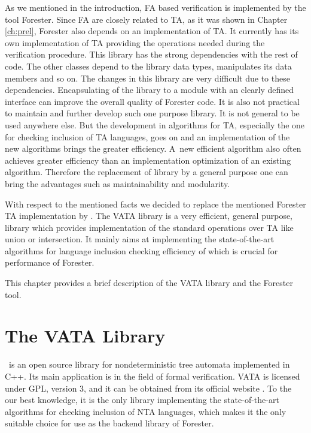 As we mentioned in the introduction, FA based verification is implemented
by the tool Forester.
Since FA are closely related to TA, as it was shown in Chapter \ref{ch:prel},
Forester also depends on an implementation of TA.
It currently has its own implementation of TA providing the operations needed during the verification procedure.
This library has the strong dependencies with the rest of code.
The other classes depend to the library data types,
manipulates its data members and so on.
The changes in this library are very difficult due to these dependencies.
Encapsulating of the library to a module with an clearly defined interface
can improve the overall quality of Forester code.
It is also not practical to maintain and further develop such one purpose library.
It is not general to be used anywhere else.
But the development in algorithms for TA, especially the one for checking inclusion of TA
languages, goes on and an implementation of the new algorithms brings the greater efficiency.
A~new efficient algorithm also often achieves greater efficiency than
an implementation optimization of an existing algorithm.
Therefore the replacement of library by a general purpose one
can bring the advantages such as maintainability and modularity.

With respect to the mentioned facts we decided to replace
the mentioned Forester TA implementation by \vata.
The VATA library is a very efficient, general purpose, library which provides implementation
of the standard operations over TA like union or intersection.
It mainly aims at implementing the state-of-the-art algorithms \cite{tacas10}
for language inclusion checking efficiency of which
is crucial for performance of Forester.

This chapter provides a brief description of the VATA library and the Forester tool.

\section{The VATA Library}
\label{sec:VATA}

\Vata\ is an open source library for nondeterministic tree automata implemented in C++.
Its main application is in the field of formal verification.
VATA is licensed under GPL, version 3, and it can be obtained from its official website \cite{www:libvata}.
To the our best knowledge, it is the only library implementing
the state-of-the-art algorithms for checking inclusion of NTA languages,
which makes it the only suitable choice for use as the backend library of Forester.

